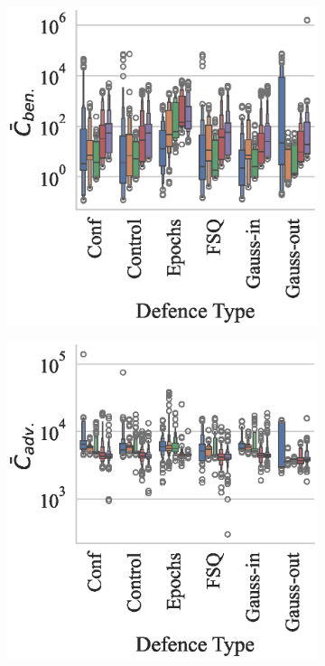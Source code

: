 \begin{figure}
    \centering
    \begin{subfigure}[]{.3\textwidth}
        \centering
        \includegraphics[width=\textwidth]{mnist_ben_failures_per_train_time_vs_defence_type.eps}
    \end{subfigure}
    \begin{subfigure}[]{0.3\textwidth}
        \includegraphics[width=\textwidth]{mnist_adv_failures_per_train_time_vs_defence_type.eps}

\end{subfigure}
\end{figure}
